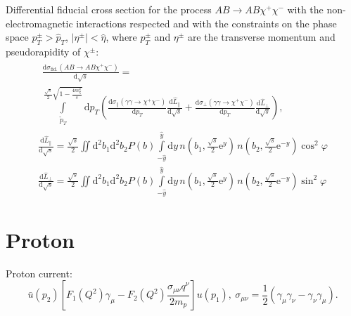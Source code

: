 \documentclass[a4paper,12pt]{article}
\newcommand{\abs}[1]{\lvert #1 \rvert}
\begin{document}
Differential fiducial cross section for the process $AB \to AB \chi^+ \chi^-$
with the non-electromagnetic interactions respected and with the constraints on
the phase space $p_T^\pm > \hat p_T$, $\abs{\eta^\pm} < \hat \eta$, where
$p_T^\pm$ and $\eta^\pm$ are the transverse momentum and pseudorapidity of
$\chi^\pm$:
\begin{gather}
  \begin{multlined}
    \frac{\mathrm{d} \sigma_\text{fid.}(AB \to AB \chi^+ \chi^-)}
         {\mathrm{d} \sqrt{s}}
    = \\ \int\limits_{\tilde p_T}
                    ^{\frac{\sqrt{s}}{2} \sqrt{1 - \frac{4 m_\chi^2}{s}}}
        \mathrm{d} p_T
        \left(
            \frac{\mathrm{d} \sigma_\parallel(\gamma \gamma \to \chi^+ \chi^-)}
                 {\mathrm{d} p_T}
            \frac{\mathrm{d} \hat L_\parallel}{\mathrm{d} \sqrt{s}}
          + \frac{\mathrm{d} \sigma_\perp(\gamma \gamma \to \chi^+ \chi^-)}
                 {\mathrm{d} p_T}
            \frac{\mathrm{d} \hat L_\perp}{\mathrm{d} \sqrt{s}}
        \right),
  \end{multlined}
  \\
  \frac{\mathrm{d} \hat L_\parallel}{\mathrm{d} \sqrt{s}}
  = \frac{\sqrt{s}}{2}
    \iint \mathrm{d}^2 b_1 \mathrm{d}^2 b_2 P(b)
    \int\limits_{-\hat y}^{\hat y} \mathrm{d} y
    \, n \left( b_1, \frac{\sqrt{s}}{2} \mathrm{e}^y    \right)
    \, n \left( b_2, \frac{\sqrt{s}}{2} \mathrm{e}^{-y} \right)
    \cos^2 \varphi
  \\
  \frac{\mathrm{d} \hat L_\perp}{\mathrm{d} \sqrt{s}}
  = \frac{\sqrt{s}}{2}
    \iint \mathrm{d}^2 b_1 \mathrm{d}^2 b_2 P(b)
    \int\limits_{-\hat y}^{\hat y} \mathrm{d} y
    \, n \left( b_1, \frac{\sqrt{s}}{2} \mathrm{e}^y    \right)
    \, n \left( b_2, \frac{\sqrt{s}}{2} \mathrm{e}^{-y} \right)
    \sin^2 \varphi
\end{gather}

\section{Proton}

Proton current:
\begin{equation}
  \bar u(p_2) \left[
    F_1(Q^2) \gamma_\mu - F_2(Q^2) \frac{\sigma_{\mu \nu} q^\nu}{2 m_p}
  \right] u(p_1),
  \ 
  \sigma_{\mu \nu} = \frac12 ( \gamma_\mu \gamma_\nu - \gamma_\nu \gamma_\mu).
\end{equation}
\end{document}
